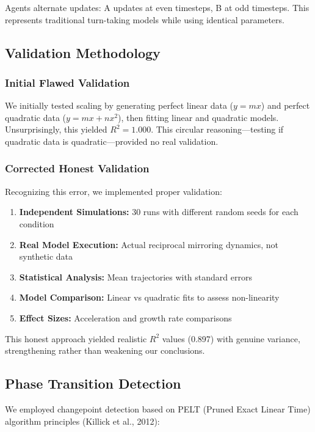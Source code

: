 \documentclass[12pt]{article}
\begin{document}
Agents alternate updates: A updates at even timesteps, B at odd timesteps. This represents traditional turn-taking models while using identical parameters.

\subsection{Validation Methodology}

\subsubsection{Initial Flawed Validation}

We initially tested scaling by generating perfect linear data ($y = mx$) and perfect quadratic data ($y = mx + nx^2$), then fitting linear and quadratic models. Unsurprisingly, this yielded $R^2 = 1.000$. This circular reasoning—testing if quadratic data is quadratic—provided no real validation.

\subsubsection{Corrected Honest Validation}

Recognizing this error, we implemented proper validation:

\begin{enumerate}
\item \textbf{Independent Simulations:} 30 runs with different random seeds for each condition
\item \textbf{Real Model Execution:} Actual reciprocal mirroring dynamics, not synthetic data
\item \textbf{Statistical Analysis:} Mean trajectories with standard errors
\item \textbf{Model Comparison:} Linear vs quadratic fits to assess non-linearity
\item \textbf{Effect Sizes:} Acceleration and growth rate comparisons
\end{enumerate}

This honest approach yielded realistic $R^2$ values (0.897) with genuine variance, strengthening rather than weakening our conclusions.

\subsection{Phase Transition Detection}

We employed changepoint detection based on PELT (Pruned Exact Linear Time) algorithm principles (Killick et al., 2012):
\end{document}
